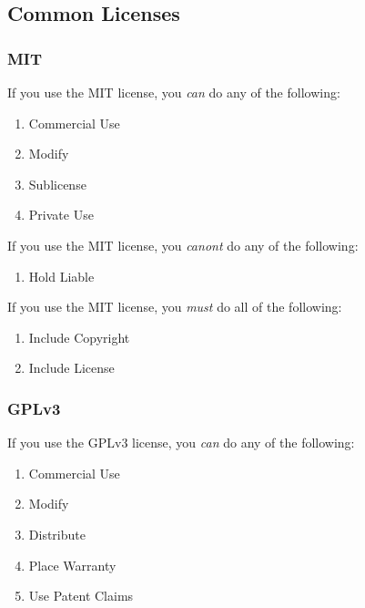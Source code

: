 \subsection{Common Licenses}\label{common-licenses}

\subsubsection{MIT}

\begin{flushleft}
	If you use the MIT license, you \emph{can} do any of the following:
\end{flushleft}

\begin{enumerate}
	\item Commercial Use
	\item Modify
	\item Sublicense
	\item Private Use
\end{enumerate}

\begin{flushleft}
	If you use the MIT license, you \emph{canont} do any of the following:
\end{flushleft}

\begin{enumerate}
	\item Hold Liable
\end{enumerate}

\begin{flushleft}
	If you use the MIT license, you \emph{must} do all of the following:
\end{flushleft}

\begin{enumerate}
	\item Include Copyright
	\item Include License
\end{enumerate}


\subsubsection{GPLv3}

\begin{flushleft}
	If you use the GPLv3 license, you \emph{can} do any of the following:
\end{flushleft}

\begin{enumerate}
	\item Commercial Use
	\item Modify
	\item Distribute
	\item Place Warranty
	\item Use Patent Claims
\end{enumerate}

